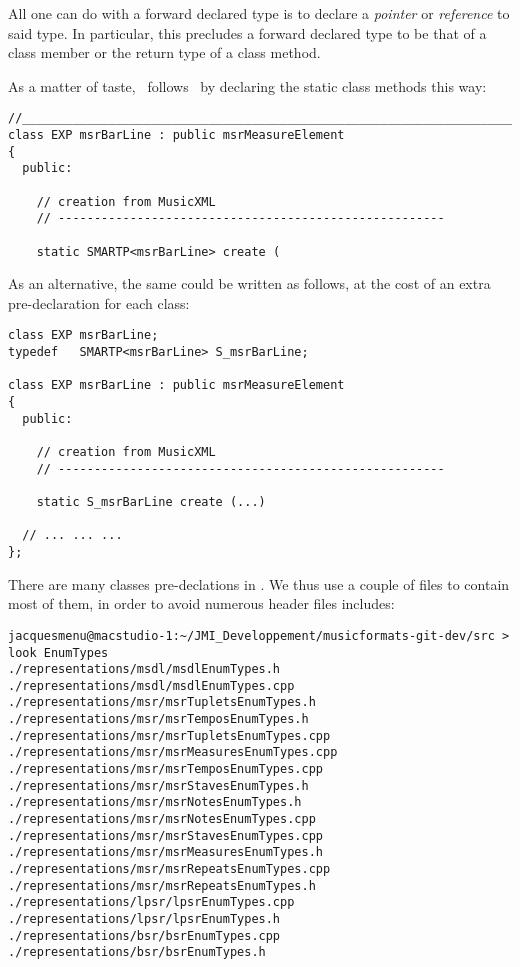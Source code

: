 All one can do with a forward declared type is to declare a {\it pointer} or {\it reference} to said type. In particular, this precludes a forward declared type to be that of a class member or the return type of a class method.


As a matter of taste, \mf\ follows \libmusicxml\ by declaring the  static class methods this way:
\begin{lstlisting}[language=CPlusPlus]
//______________________________________________________________________________
class EXP msrBarLine : public msrMeasureElement
{
  public:

    // creation from MusicXML
    // ------------------------------------------------------

    static SMARTP<msrBarLine> create (
\end{lstlisting}

As an alternative, the same could be written as follows, at the cost of an extra pre-declaration for each class:
\begin{lstlisting}[language=CPlusPlus]
class EXP msrBarLine;
typedef   SMARTP<msrBarLine> S_msrBarLine;

class EXP msrBarLine : public msrMeasureElement
{
  public:

    // creation from MusicXML
    // ------------------------------------------------------

    static S_msrBarLine create (...)

  // ... ... ...
};
\end{lstlisting}


There are many classes pre-declations in \mf. We thus use a couple of  files to contain most of them, in order to avoid numerous header files includes:
\begin{lstlisting}[language=CPlusPlus]
jacquesmenu@macstudio-1:~/JMI_Developpement/musicformats-git-dev/src > look EnumTypes
./representations/msdl/msdlEnumTypes.h
./representations/msdl/msdlEnumTypes.cpp
./representations/msr/msrTupletsEnumTypes.h
./representations/msr/msrTemposEnumTypes.h
./representations/msr/msrTupletsEnumTypes.cpp
./representations/msr/msrMeasuresEnumTypes.cpp
./representations/msr/msrTemposEnumTypes.cpp
./representations/msr/msrStavesEnumTypes.h
./representations/msr/msrNotesEnumTypes.h
./representations/msr/msrNotesEnumTypes.cpp
./representations/msr/msrStavesEnumTypes.cpp
./representations/msr/msrMeasuresEnumTypes.h
./representations/msr/msrRepeatsEnumTypes.cpp
./representations/msr/msrRepeatsEnumTypes.h
./representations/lpsr/lpsrEnumTypes.cpp
./representations/lpsr/lpsrEnumTypes.h
./representations/bsr/bsrEnumTypes.cpp
./representations/bsr/bsrEnumTypes.h
\end{lstlisting}


